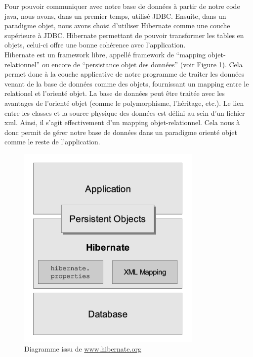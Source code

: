 Pour pouvoir communiquer avec notre base de données à partir de notre code java, nous avons, dans un premier temps, utilisé JDBC. Ensuite, dans un paradigme objet, nous avons  choisi d'utiliser Hibernate comme une couche supérieure à JDBC. Hibernate permettant de pouvoir transformer les tables en objets, celui-ci offre une bonne cohérence avec l'application.\\
\newline
\indent
Hibernate est un framework libre, appellé framework de  \enquote{mapping objet-relationnel} ou encore de \enquote{persistance objet des données} (voir Figure \ref{reference2}). 
\newline
\indent
Cela permet donc à la couche applicative de notre programme de traiter les données venant de la base de données comme des objets, fournissant un mapping entre le relationel et l'orienté objet.
\newline
\indent
 La base de données peut être traitée avec les avantages de l'orienté objet (comme le polymorphisme, l'héritage, etc.). Le lien entre les classes et la source physique des données  est défini au sein d'un fichier xml. Ainsi, il s'agit effectivement d'un mapping objet-relationnel.
 \newline
 \indent
Cela nous à donc permit de gérer notre base de données dans un paradigme orienté objet comme le reste de l'application.
\begin{figure}[!h]
    \center
   	\includegraphics[scale=0.65]{schema_hibernate.png}
   	\caption{Diagramme issu de \url{www.hibernate.org}}
    \label{reference2}
\end{figure}

